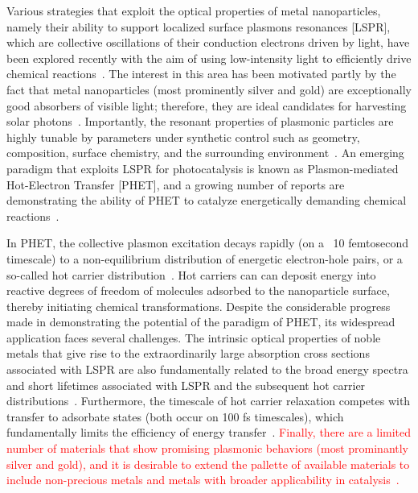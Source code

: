 \documentclass[journal=jpclcd,manuscript=article]{achemso}
\begin{document}
Various strategies that exploit the optical properties of metal nanoparticles, namely their ability to support localized surface plasmons resonances [LSPR], 
which are collective oscillations of their 
conduction electrons driven by light, have been explored recently with the aim of using low-intensity light to efficiently drive chemical 
reactions~\cite{LCI_NatureMater_2011,KAC_ACSCatalysis_2013,ZLQ_RSCAdvances_2015,PKL_AccChemRes_2015}.  The interest in this area has 
been motivated partly by the fact that metal nanoparticles (most prominently silver and gold) are exceptionally good absorbers of visible light; therefore,
they are ideal candidates for harvesting solar photons~\cite{AP_NatMat_2010}.  
Importantly, the resonant properties of plasmonic particles are highly tunable by parameters under synthetic control such as geometry, composition, surface chemistry, and the surrounding 
environment~\cite{SX_Science_2002,BCN_ChemRev_2005,GB_NatPhoton_2010}.  An emerging paradigm that exploits LSPR for photocatalysis is known as Plasmon-mediated Hot-Electron Transfer [PHET],
and a growing number of reports are demonstrating the ability of PHET to catalyze energetically demanding chemical 
reactions~\cite{CXL_NatureChem_2011,MZL_Science_2013,MLL_NanoLett_2013,LFP_AC_2015,ZHX_NatPhoton_2016,ZJM_ACSNano_2016,SZZ_PNAS_2016,SCR_JPCC_2016}.

In PHET, the collective plasmon excitation decays rapidly (on a ~10 femtosecond timescale) to a non-equilibrium distribution of energetic electron-hole pairs, or a so-called hot carrier 
distribution~\cite{KAC_ACSCatalysis_2013,GZG_JPCC_2013,SNJ_NatComm_2014,WCM_Science_2015,MWW_NatComm_2015, BSN_ACSNano_2016}.  
Hot carriers can can deposit energy into reactive degrees of freedom of molecules adsorbed to the nanoparticle surface, thereby initiating chemical transformations.  Despite the considerable progress made in 
demonstrating the potential of the paradigm of PHET, its widespread application faces several challenges. The intrinsic optical properties of noble metals that give rise to the extraordinarily 
large absorption cross sections associated with LSPR are also fundamentally related to the broad energy spectra and short lifetimes associated with LSPR and the subsequent hot carrier 
distributions~\cite{KS_JCP_1983}. 
Furthermore, the timescale of hot carrier relaxation competes 
with transfer to adsorbate states (both occur on 100 fs timescales), which fundamentally limits the efficiency of energy transfer~\cite{WCM_Science_2015}.  \textcolor{red}{Finally, there are a limited number of materials that show promising plasmonic
behaviors (most prominantly silver and gold), and it is desirable to extend the pallette of available materials to include
non-precious metals and metals with broader applicability in catalysis~\cite{SZZ_PNAS_2016}.}
\end{document}
